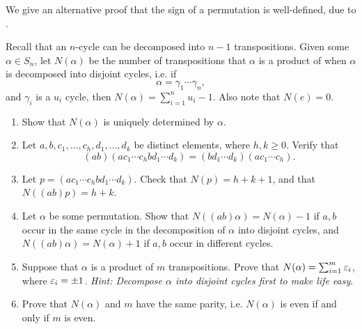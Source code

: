 \documentclass[./main.tex]{subfiles}
\begin{document}
\begin{exercise}
\label{ex:jacobson-permutation-sign}
    We give an alternative proof that the sign of a permutation is well-defined,
    due to \autocite[\pno~50]{Jacobson_2009}.

    Recall that an $n$-cycle can be decomposed into $n-1$ transpositions. Given
    some $\alpha \in S_n$, let $N(\alpha)$ be the number of transpositions that
    $\alpha$ is a product of when $\alpha$ is decomposed into disjoint cycles, i.e. 
    if 
    \[
        \alpha = \gamma_1 \cdots \gamma_n,
    \]
    and $\gamma_i$ is a $u_i$ cycle, then $N(\alpha) = \sum_{i=1}^n u_i - 1$.
    Also note that $N(e) = 0$.
    \begin{enumerate}[label=(\alph*)]
        \item Show that $N(\alpha)$ is uniquely determined by $\alpha$. 
        \item Let $a, b, c_1, \dots, c_h, d_1, \dots, d_k$ be distinct elements,
        where $h, k \geq 0$. Verify that 
        \[
            (ab)(ac_1 \cdots c_h b d_1 \cdots d_k) = (bd_1 \cdots d_k)(ac_1 \cdots c_h).
        \]
        \item Let $p = (ac_1 \cdots c_h b d_1 \cdots d_k)$. Check that $N(p) = h
        + k + 1$, and that $N((ab)p) = h + k$. 
        \item Let $\alpha$ be some permutation. Show that $N((ab) \alpha) =
        N(\alpha) - 1$ if $a, b$ occur in the same cycle in the decomposition of
        $\alpha$ into disjoint cycles, and $N((ab)\alpha) = N(\alpha) + 1$ if
        $a, b$ occur in different cycles. 
        \item Suppose that $\alpha$ is a product of $m$ transpositions. Prove
        that $N(\alpha) = \sum_{i=1}^m \varepsilon_i$, where $\varepsilon_i = \pm 1$.
        \textit{Hint: Decompose $\alpha$ into disjoint cycles first to make life
        easy}.
        \item Prove that $N(\alpha)$ and $m$ have the same parity, i.e.
        $N(\alpha)$ is even if and only if $m$ is even.
    \end{enumerate}
\end{exercise}
\end{document}
